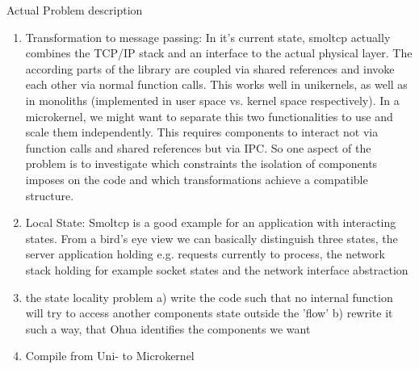 Actual Problem description
\begin{itemize}
    \begin{enumerate}
        \item Transformation to message passing: In it's current state, smoltcp actually combines the TCP/IP stack and an interface to the actual physical layer. The according parts of the library are coupled via shared references and invoke each other via normal function calls. This works well in unikernels, as well as in monoliths (implemented in user space vs. kernel space respectively). In a microkernel, we might want to separate this two functionalities to use and scale them independently. This requires components to interact not via function calls and shared references but via IPC. So one aspect of the problem is to investigate which constraints the isolation of components imposes on the code and which transformations achieve a compatible structure. 
        \item Local State: Smoltcp is a good example for an application with interacting states. From a bird's eye view we can basically distinguish three states, the server application holding e.g. requests currently to process, the network stack holding for example socket states and the network interface abstraction
    
        \item the state locality problem a) write the code such that no internal function will try to access another components state outside the 'flow' b) rewrite it such a way, that Ohua identifies the components we want
        
        \item Compile from Uni- to Microkernel 
        
    \end{enumerate}
   
\end{itemize}
